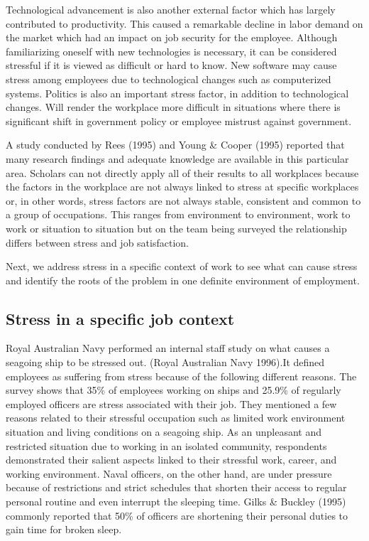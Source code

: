 Technological advancement is also another external factor which has largely contributed to productivity. This caused a remarkable decline in labor demand on the market which had an impact on job security for the employee. Although familiarizing oneself with new technologies is necessary, it can be considered stressful if it is viewed as difficult or hard to know. New software may cause stress among employees due to technological changes such as computerized systems. Politics is also an important stress factor, in addition to technological changes. Will render the workplace more difficult in situations where there is significant shift in government policy or employee mistrust against government.  \citep[p.309-320]{Bloisi2007ManagementBehaviour}

A study conducted by Rees (1995) and Young \& Cooper (1995) reported that many research findings and adequate knowledge are available in this particular area. Scholars can not directly apply all of their results to all workplaces because the factors in the workplace are not always linked to stress at specific workplaces or, in other words, stress factors are not always stable, consistent and common to a group of occupations. This ranges from environment to environment, work to work or situation to situation but on the team being surveyed the relationship differs between stress and job satisfaction.  \citep[p.  8]{Fairbrother2003WorkplaceSatisfaction}  

Next, we address stress in a specific context of work to see what can cause stress and identify the roots of the problem in one definite environment of employment.
\subsection{Stress in a specific job context}
Royal Australian Navy performed an internal staff study on what causes a seagoing ship to be stressed out. (Royal Australian Navy 1996).It defined employees as suffering from stress because of the following different reasons. The survey shows that 35\% of employees working on ships and 25.9\% of regularly employed officers are stress associated with their job. They mentioned a few reasons related to their stressful occupation such as limited work environment situation and living conditions on a seagoing ship. As an unpleasant and restricted situation due to working in an isolated community, respondents demonstrated their salient aspects linked to their stressful work, career, and working environment.  Naval officers, on the other hand, are under pressure because of restrictions and strict schedules that shorten their access to regular personal routine and even interrupt the sleeping time.  Gilks \& Buckley (1995) commonly reported that 50\% of officers are shortening their personal duties to gain time for broken sleep.

